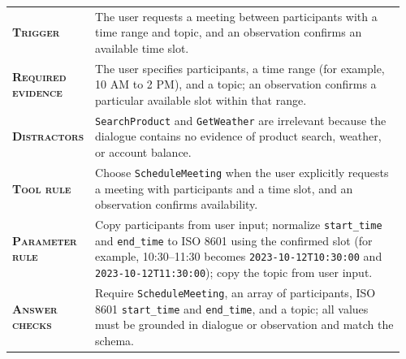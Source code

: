 \begin{table}[htbp]
\centering
\begin{minipage}{0.97\textwidth}
\raggedright
\small
\setlength{\tabcolsep}{3pt}
\renewcommand{\arraystretch}{1.16}
\vspace{0.35em}
\begin{tabular}{@{}>{\raggedright\arraybackslash\bfseries}p{0.17\linewidth} >{\raggedright\arraybackslash}p{0.79\linewidth}@{}}
    \textsc{Trigger} & The user requests a meeting between participants with a time range and topic, and an observation confirms an available time slot. \\
    \textsc{Required evidence} & The user specifies participants, a time range (for example, 10 AM to 2 PM), and a topic; an observation confirms a particular available slot within that range. \\
    \textsc{Distractors} & \texttt{SearchProduct} and \texttt{GetWeather} are irrelevant because the dialogue contains no evidence of product search, weather, or account balance. \\
    \textsc{Tool rule} & Choose \texttt{ScheduleMeeting} when the user explicitly requests a meeting with participants and a time slot, and an observation confirms availability. \\
    \textsc{Parameter rule} & Copy participants from user input; normalize \texttt{start\_time} and \texttt{end\_time} to ISO 8601 using the confirmed slot (for example, 10:30--11:30 becomes \texttt{2023-10-12T10:30:00} and \texttt{2023-10-12T11:30:00}); copy the topic from user input. \\
    \textsc{Answer checks} & Require \texttt{ScheduleMeeting}, an array of participants, ISO 8601 \texttt{start\_time} and \texttt{end\_time}, and a topic; all values must be grounded in dialogue or observation and match the schema. \\
\end{tabular}
\vspace{0.45em}
\end{minipage}
\end{table}

